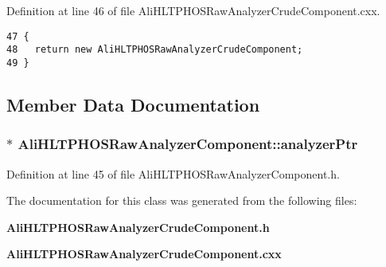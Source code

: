 Definition at line 46 of file Ali\-HLTPHOSRaw\-Analyzer\-Crude\-Component.cxx.

\footnotesize\begin{verbatim}47 {
48   return new AliHLTPHOSRawAnalyzerCrudeComponent;
49 }
\end{verbatim}\normalsize 




\subsection{Member Data Documentation}
\subsubsection{$\ast$ {\bf Ali\-HLTPHOSRaw\-Analyzer\-Component::analyzer\-Ptr}\hspace{0.3cm}{\tt  [protected, inherited]}}\label{classAliHLTPHOSRawAnalyzerComponent_AliHLTPHOSRawAnalyzerPeakFinderComponentp0}




Definition at line 45 of file Ali\-HLTPHOSRaw\-Analyzer\-Component.h.

The documentation for this class was generated from the following files:\begin{CompactItemize}
\item 
{\bf Ali\-HLTPHOSRaw\-Analyzer\-Crude\-Component.h}\item 
{\bf Ali\-HLTPHOSRaw\-Analyzer\-Crude\-Component.cxx}\end{CompactItemize}

